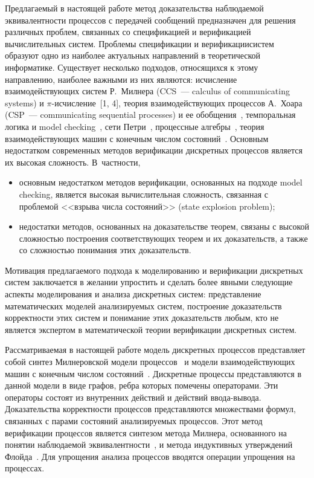 \begin{multicols}{2}
Предлагаемый в настоящей работе метод доказательства наблюдаемой
эквивалентности про\-цессов с передачей сообщений предназначен для\linebreak
решения различных проблем, связанных со спе\-цификацией и верификацией
вычислительных сис\-тем. Проблемы спецификации и верификации\linebreak сис\-тем
образуют одно из наиболее актуальных на\-прав\-ле\-ний в теоретической
информатике. Существует несколько подходов, относящихся к этому
на\-прав\-ле\-нию, наиболее важными из них являются: исчисление
взаимодействующих сис\-тем Р.~Милнера (CCS~--- calculus of communicating systems)
и $\pi$-ис\-чис\-ле\-ние~[1, 4],
теория взаимодействующих процессов А.~Хоара (CSP~--- communicating sequential
processes) и ее обобщения~\cite{3-mir},
темпоральная логика и model checking~\cite{4-mir}, сети Петри~\cite{5-mir},
процессные алгебры~\cite{6-mir}, теория взаимодействующих
машин с конечным числом состояний~\cite{7-mir}. Основным недостатком
современных методов верификации дискретных процессов является их
высокая сложность. В~частности,
\begin{itemize}
\item основным недостатком методов верификации, основанных на подходе model checking, является высокая
вычислительная сложность, связанная с проблемой <<взрыва числа
состояний>> (state explosion problem);
\item недостатки методов, основанных на доказательстве теорем, связаны с высокой
слож\-ностью
построения соответствующих теорем и их доказательств, а также со
сложностью понимания этих доказательств.
\end{itemize}

Мотивация предлагаемого подхода  к моделированию и верификации дискретных
 систем заключается в желании упростить  и сделать более явными следующие аспекты
 моделирования и анализа дискретных систем:  представление математических моделей
анализируемых систем,  построение доказательств корректности этих систем и
 понимание этих доказательств любым, кто не является экспертом в математической
теории верификации дискретных систем.

Рассматриваемая в настоящей работе модель дискретных процессов
представляет собой синтез Милнеровской модели процессов~\cite{1-mir} и модели
взаимодействующих машин с конечным числом состояний~\cite{7-mir}.
Дискретные процессы представляются в данной модели в виде графов,
ребра которых помечены  операторами. Эти операторы состоят из
внутренних действий и действий вво\-да-вы\-во\-да.
Доказательства корректности процессов пред\-став\-ля\-ют\-ся множествами формул, связанных
с парами состояний анализируемых процессов. Этот метод верификации процессов является
синтезом метода Милнера, основанного на понятии наблюдаемой эквивалентности~\cite{1-mir},
и метода индуктивных утверждений Флойда~\cite{8-mir}.
Для упрощения анализа процессов  вводятся операции упрощения на процессах.



\end{multicols}
